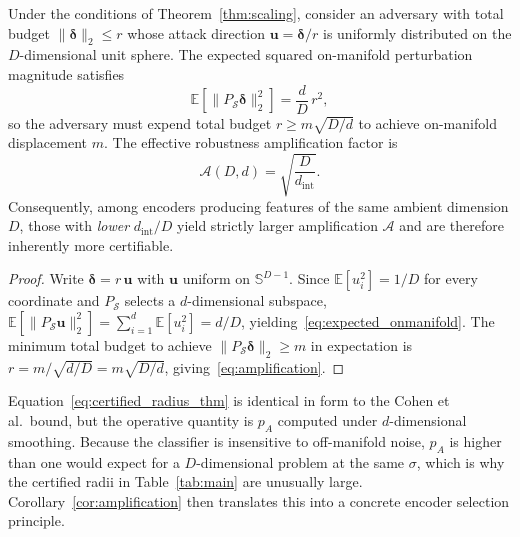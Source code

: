 \begin{corollary}
\label{cor:amplification}
Under the conditions of Theorem~\ref{thm:scaling}, consider an
adversary with total budget $\|\boldsymbol{\delta}\|_2 \leq r$
whose attack direction $\mathbf{u} = \boldsymbol{\delta}/r$ is
uniformly distributed on the $D$-dimensional unit sphere.
The expected squared on-manifold perturbation magnitude satisfies
\begin{equation}
  \mathbb{E}\!\left[\|P_\mathcal{S}\boldsymbol{\delta}\|_2^2\right]
    = \frac{d}{D}\,r^2,
  \label{eq:expected_onmanifold}
\end{equation}
so the adversary must expend total budget
$r \geq m\sqrt{D/d}$ to achieve on-manifold displacement $m$.
The effective robustness amplification factor is
\begin{equation}
  \mathcal{A}(D,d) = \sqrt{\frac{D}{d_\text{int}}}.
  \label{eq:amplification}
\end{equation}
Consequently, among encoders producing features of the same ambient
dimension $D$, those with \emph{lower} $d_\text{int}/D$ yield
strictly larger amplification $\mathcal{A}$ and are therefore
inherently more certifiable.
\end{corollary}

\begin{proof}
Write $\boldsymbol{\delta} = r\,\mathbf{u}$ with $\mathbf{u}$
uniform on $\mathbb{S}^{D-1}$.
Since $\mathbb{E}[u_i^2] = 1/D$ for every coordinate and
$P_\mathcal{S}$ selects a $d$-dimensional subspace,
$\mathbb{E}[\|P_\mathcal{S}\mathbf{u}\|_2^2]
 = \sum_{i=1}^{d}\mathbb{E}[u_i^2] = d/D$,
yielding~\eqref{eq:expected_onmanifold}.
The minimum total budget to achieve
$\|P_\mathcal{S}\boldsymbol{\delta}\|_2 \geq m$ in expectation
is $r = m/\sqrt{d/D} = m\sqrt{D/d}$, giving~\eqref{eq:amplification}.
\end{proof}

\begin{remark}
\label{rem:cohen_relation}
Equation~\eqref{eq:certified_radius_thm} is identical in form to
the Cohen et al.\ bound, but the operative quantity is $p_A$ computed
under $d$-dimensional smoothing.
Because the classifier is insensitive to off-manifold noise,
$p_A$ is higher than one would expect for a $D$-dimensional problem
at the same $\sigma$, which is why the certified radii in
Table~\ref{tab:main} are unusually large.
Corollary~\ref{cor:amplification} then translates this into a
concrete encoder selection principle.
\end{remark}


